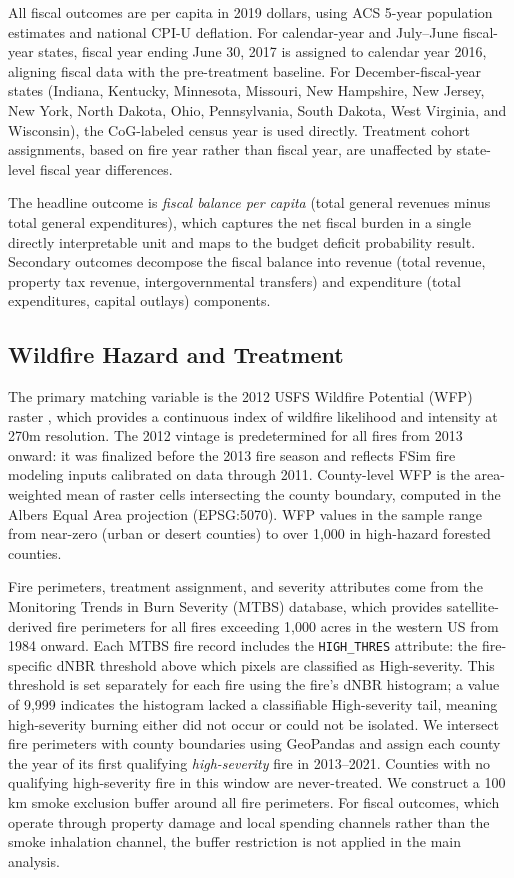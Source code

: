 \documentclass[12pt]{article}
\begin{document}
All fiscal outcomes are per capita in 2019 dollars, using ACS 5-year population
estimates and national CPI-U deflation. For calendar-year and July--June fiscal-year
states, fiscal year ending June 30, 2017 is assigned to calendar year 2016, aligning
fiscal data with the pre-treatment baseline. For December-fiscal-year states
(Indiana, Kentucky, Minnesota, Missouri, New Hampshire, New Jersey, New York,
North Dakota, Ohio, Pennsylvania, South Dakota, West Virginia, and Wisconsin), the
CoG-labeled census year is used directly. Treatment cohort assignments, based on
fire year rather than fiscal year, are unaffected by state-level fiscal year
differences.

The headline outcome is \textit{fiscal balance per capita} (total general revenues
minus total general expenditures), which captures the net fiscal burden in a
single directly interpretable unit and maps to the \citet{liao2022} budget deficit
probability result. Secondary outcomes decompose the fiscal balance into revenue
(total revenue, property tax revenue, intergovernmental transfers) and
expenditure (total expenditures, capital outlays) components.

\subsection{Wildfire Hazard and Treatment}

The primary matching variable is the 2012 USFS Wildfire Potential (WFP) raster
\citep[RDS-2015-0045]{scott2013}, which provides a continuous
index of wildfire likelihood and intensity at 270m resolution. The 2012 vintage is
predetermined for all fires from 2013 onward: it was finalized before the 2013 fire
season and reflects FSim fire modeling inputs calibrated on data through 2011.
County-level WFP is the area-weighted mean of raster cells intersecting the county
boundary, computed in the Albers Equal Area projection (EPSG:5070). WFP values
in the sample range from near-zero (urban or desert counties) to over 1,000 in
high-hazard forested counties.

Fire perimeters, treatment assignment, and severity attributes come from the
Monitoring Trends in Burn Severity (MTBS) database, which provides satellite-derived
fire perimeters for all fires exceeding 1,000 acres in the western US from 1984
onward. Each MTBS fire record includes the \texttt{HIGH\_THRES} attribute: the
fire-specific dNBR threshold above which pixels are classified as High-severity.
This threshold is set separately for each fire using the fire's dNBR histogram;
a value of 9,999 indicates the histogram lacked a classifiable High-severity tail,
meaning high-severity burning either did not occur or could not be isolated.
We intersect fire perimeters with county boundaries using GeoPandas and assign each
county the year of its first qualifying \textit{high-severity} fire in 2013--2021.
Counties with no qualifying high-severity fire in this window are never-treated.
We construct a 100 km smoke exclusion buffer around all fire perimeters. For fiscal
outcomes, which operate through property damage and local spending channels rather
than the smoke inhalation channel, the buffer restriction is not applied in the
main analysis.
\end{document}
